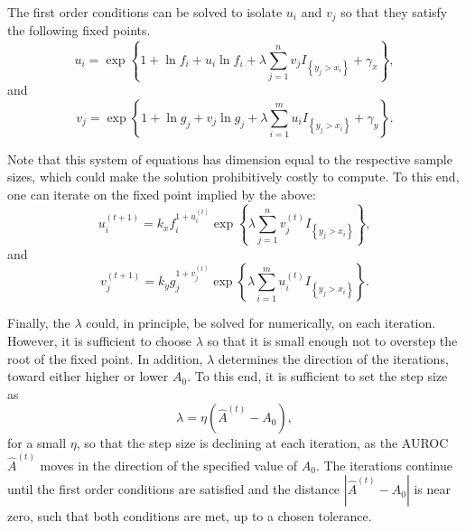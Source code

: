 The first order conditions can be solved to isolate $u_i$ and $v_j$ so that they satisfy the following fixed points.
\begin{equation}
    u_i = \exp{ \left\{ 1 + \ln f_i + u_i \ln f_i
                + \lambda \sum_{j = 1}^{n} v_j I_{\left\{ y_j > x_i \right\}} + \gamma_x \right\} },
\end{equation}
\noindent and
\begin{equation}
    v_j = \exp{ \left\{ 1 + \ln g_j + v_j \ln g_j
                + \lambda \sum_{i = 1}^{m} u_i I_{\left\{ y_j > x_i \right\}} + \gamma_y \right\} }.
\end{equation}

Note that this system of equations has dimension equal to the respective sample sizes, which could make the solution prohibitively costly to compute.
To this end, one can iterate on the fixed point implied by the above:
\begin{equation}
    u_i^{(t+1)} = k_x f_i ^{1 + u_i^{(t)}}
                \exp{ \left\{ \lambda \sum_{j = 1}^{n} v_j^{(t)} I_{\left\{ y_j > x_i \right\}} \right\} },
\end{equation}
and
\begin{equation}
    v_j^{(t+1)} = k_y g_j ^{1 + v_j^{(t)}}
                \exp{ \left\{ \lambda \sum_{i = 1}^{m} u_i^{(t)} I_{\left\{ y_j > x_i \right\}}  \right\} }.
\end{equation}




Finally, the $\lambda$ could, in principle, be solved for numerically, on each iteration.
However, it is sufficient to choose $\lambda$ so that it is small enough not to overstep the root of the fixed point.
In addition, $\lambda$ determines the direction of the iterations, toward either higher or lower $A_0$.
To this end, it is sufficient to set the step size as
\begin{equation}
    \lambda = \eta (\hat{A}^{(t)} - A_0),
\end{equation}
for a small $\eta$, so that the step size is declining at each iteration, as the AUROC $\hat{A}^{(t)}$ moves in the direction of the specified value of $A_0$.
The iterations continue until the first order conditions are satisfied and the distance $|\hat{A}^{(t)} - A_0|$ is near zero, such that both conditions are met, up to a chosen tolerance.


